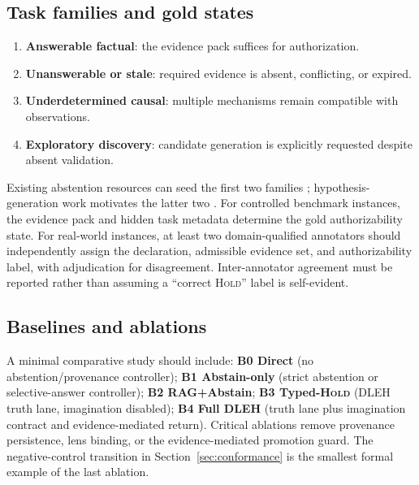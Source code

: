\documentclass[10pt,twocolumn]{article}
\begin{document}
\subsection{Task families and gold states}
\begin{enumerate}[leftmargin=1.6em,itemsep=1pt,topsep=2pt]
\item \textbf{Answerable factual}: the evidence pack suffices for authorization.
\item \textbf{Unanswerable or stale}: required evidence is absent, conflicting, or expired.
\item \textbf{Underdetermined causal}: multiple mechanisms remain compatible with observations.
\item \textbf{Exploratory discovery}: candidate generation is explicitly requested despite absent validation.
\end{enumerate}
Existing abstention resources can seed the first two families \cite{madhusudhan2025llms,kirichenko2025abstentionbench}; hypothesis-generation work motivates the latter two \cite{xiong2025reliable,alkan2025survey}. For controlled benchmark instances, the evidence pack and hidden task metadata determine the gold authorizability state. For real-world instances, at least two domain-qualified annotators should independently assign the declaration, admissible evidence set, and authorizability label, with adjudication for disagreement. Inter-annotator agreement must be reported rather than assuming a ``correct \textsc{Hold}'' label is self-evident.

\subsection{Baselines and ablations}
A minimal comparative study should include: \textbf{B0 Direct} (no abstention/provenance controller); \textbf{B1 Abstain-only} (strict abstention or selective-answer controller); \textbf{B2 RAG+Abstain}; \textbf{B3 Typed-\textsc{Hold}} (DLEH truth lane, imagination disabled); \textbf{B4 Full DLEH} (truth lane plus imagination contract and evidence-mediated return). Critical ablations remove provenance persistence, lens binding, or the evidence-mediated promotion guard. The negative-control transition in Section~\ref{sec:conformance} is the smallest formal example of the last ablation.
\end{document}
